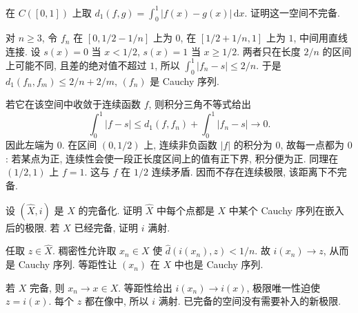 \begin{exercise}\label{ex:l1-incomplete-continuous}
在 $C([0,1])$ 上取 $d_1(f,g)=\int_0^1|f(x)-g(x)|\,\mathrm dx$. 证明这一空间不完备.
\end{exercise}
\begin{solution}
对 $n\geq3$, 令 $f_n$ 在 $[0,1/2-1/n]$ 上为 $0$, 在 $[1/2+1/n,1]$ 上为 $1$, 中间用直线连接. 设 $s(x)=0$ 当 $x<1/2$, $s(x)=1$ 当 $x\geq1/2$. 两者只在长度 $2/n$ 的区间上可能不同, 且差的绝对值不超过 $1$, 所以
$\int_0^1|f_n-s|\leq2/n$. 于是
$d_1(f_n,f_m)\leq2/n+2/m$, $(f_n)$ 是 Cauchy 序列.

若它在该空间中收敛于连续函数 $f$, 则积分三角不等式给出
\[
\int_0^1|f-s|\leq d_1(f,f_n)+\int_0^1|f_n-s|\longrightarrow0.
\]
因此左端为 $0$. 在区间 $(0,1/2)$ 上, 连续非负函数 $|f|$ 的积分为 $0$, 故每一点都为 $0$: 若某点为正, 连续性会使一段正长度区间上的值有正下界, 积分便为正. 同理在 $(1/2,1)$ 上 $f=1$. 这与 $f$ 在 $1/2$ 连续矛盾. 因而不存在连续极限, 该距离下不完备.
\end{solution}

\begin{exercise}\label{ex:completion-cauchy-limits}
设 $(\widehat X,i)$ 是 $X$ 的完备化. 证明 $\widehat X$ 中每个点都是 $X$ 中某个 Cauchy 序列在嵌入后的极限. 若 $X$ 已经完备, 证明 $i$ 满射.
\end{exercise}
\begin{solution}
任取 $z\in\widehat X$. 稠密性允许取 $x_n\in X$ 使
$\widehat d(i(x_n),z)<1/n$. 故 $i(x_n)\to z$, 从而是 Cauchy 序列. 等距性让 $(x_n)$ 在 $X$ 中也是 Cauchy 序列.

若 $X$ 完备, 则 $x_n\to x\in X$. 等距性给出 $i(x_n)\to i(x)$, 极限唯一性迫使 $z=i(x)$. 每个 $z$ 都在像中, 所以 $i$ 满射. 已完备的空间没有需要补入的新极限.
\end{solution}
